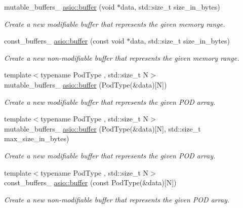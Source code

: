 \begin{DoxyCompactItemize}
mutable\+\_\+buffers\+\_ \hyperlink{group__buffer_gaa066734007c417692255c8f515f0fb01}{asio\+::buffer} (void $\ast$data, std\+::size\+\_\+t size\+\_\+in\+\_\+bytes)
\begin{DoxyCompactList}\small\item\em Create a new modifiable buffer that represents the given memory range. \end{DoxyCompactList}\item 
const\+\_\+buffers\+\_ \hyperlink{group__buffer_gaa6b6109423e7efc76b46b8d1337a5b0f}{asio\+::buffer} (const void $\ast$data, std\+::size\+\_\+t size\+\_\+in\+\_\+bytes)
\begin{DoxyCompactList}\small\item\em Create a new non-\/modifiable buffer that represents the given memory range. \end{DoxyCompactList}\item 
{\footnotesize template$<$typename Pod\+Type , std\+::size\+\_\+t N$>$ }\\mutable\+\_\+buffers\+\_ \hyperlink{group__buffer_ga9a348932d9b7ffda26ff318191489fd8}{asio\+::buffer} (Pod\+Type(\&data)\mbox{[}N\mbox{]})
\begin{DoxyCompactList}\small\item\em Create a new modifiable buffer that represents the given P\+O\+D array. \end{DoxyCompactList}\item 
{\footnotesize template$<$typename Pod\+Type , std\+::size\+\_\+t N$>$ }\\mutable\+\_\+buffers\+\_ \hyperlink{group__buffer_ga817f0fd9a7e1eebab155ccf5b62456f0}{asio\+::buffer} (Pod\+Type(\&data)\mbox{[}N\mbox{]}, std\+::size\+\_\+t max\+\_\+size\+\_\+in\+\_\+bytes)
\begin{DoxyCompactList}\small\item\em Create a new modifiable buffer that represents the given P\+O\+D array. \end{DoxyCompactList}\item 
{\footnotesize template$<$typename Pod\+Type , std\+::size\+\_\+t N$>$ }\\const\+\_\+buffers\+\_ \hyperlink{group__buffer_gae73b5385bad9b7c92afce06d92c11f1e}{asio\+::buffer} (const Pod\+Type(\&data)\mbox{[}N\mbox{]})
\begin{DoxyCompactList}\small\item\em Create a new non-\/modifiable buffer that represents the given P\+O\+D array. \end{DoxyCompactList}\item 

\end{DoxyCompactItemize}
